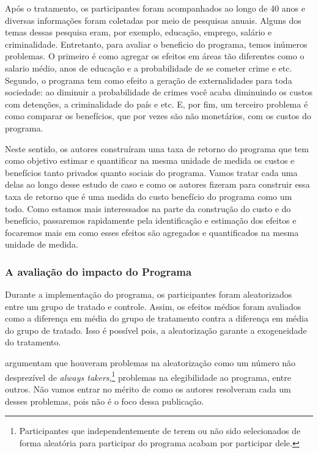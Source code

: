 \documentclass[12pt,letterpaper]{article}
\newcommand{\1}{\mathbbm{1}}
\numberwithin{equation}{section}
\begin{document}
Após o tratamento, os participantes foram acompanhados ao longo de 40 anos e diversas informações foram coletadas por meio de pesquisas anuais. Alguns dos temas dessas pesquisa eram, por exemplo, educação, emprego, salário e criminalidade. Entretanto, para avaliar o beneficio do programa, temos inúmeros problemas. O primeiro é como agregar os efeitos em áreas tão diferentes como o salario médio, anos de educação e a probabilidade de se cometer crime e etc. Segundo, o programa tem como efeito a geração de externalidades para toda sociedade: ao diminuir a probabilidade de crimes você acaba diminuindo os custos com detenções, a criminalidade do país e etc. E, por fim, um terceiro problema é como comparar os benefícios, que por vezes são não monetários, com os custos do programa. 

Neste sentido, os autores construíram uma taxa de retorno do programa que tem como objetivo estimar e quantificar na mesma unidade de medida os custos e benefícios tanto privados quanto sociais do programa. Vamos tratar cada uma delas ao longo desse estudo de caso e como os autores fizeram para construir essa taxa de retorno que é uma medida do custo benefício do programa como um todo. Como estamos mais interessados na parte da construção do custo e do benefício, passaremos rapidamente pela identificação e estimação dos efeitos e focaremos mais em como esses efeitos são agregados e quantificados na mesma unidade de medida. 

\subsubsection{A avaliação do impacto do Programa} \label{sec:avaliacao_heckman}

Durante a implementação do programa, os participantes foram aleatorizados entre um grupo de tratado e controle. Assim, os efeitos médios foram avaliados como a diferença em média do grupo de tratamento contra a diferença em média do grupo de tratado. Isso é possível pois, a aleatorização garante a exogeneidade do tratamento. 

\textcite{heckman2010rate} argumentam que houveram problemas na aleatorização como um número não desprezível de \textit{always takers},\footnote{Participantes que independentemente de terem ou não sido selecionados de forma aleatória para participar do programa acabam por participar dele.} problemas na elegibilidade ao programa, entre outros. Não vamos entrar no mérito de como os autores resolveram cada um desses problemas, pois não é o foco dessa publicação. 
\end{document}
